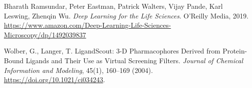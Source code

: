 \documentclass[11pt]{article}
\begin{document}
\begin{thebibliography}{99}
Bharath Ramsundar, Peter Eastman, Patrick Walters, Vijay Pande, Karl Leswing, Zhenqin Wu. 
\textit{Deep Learning for the Life Sciences}. O'Reilly Media, 2019. 
\url{https://www.amazon.com/Deep-Learning-Life-Sciences-Microscopy/dp/1492039837}

Wolber, G., Langer, T. LigandScout: 3-D Pharmacophores Derived from Protein-Bound Ligands and Their Use as Virtual Screening Filters. \textit{Journal of Chemical Information and Modeling}, 45(1), 160–169 (2004). \url{https://doi.org/10.1021/ci034243}.

\end{thebibliography}
\end{document}
